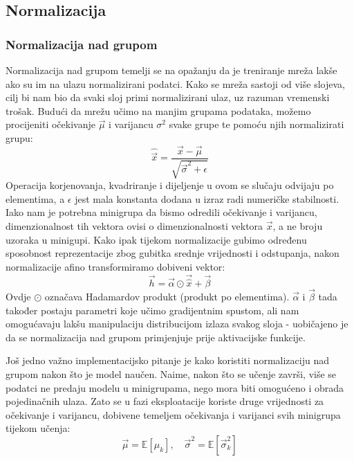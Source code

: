 \subsection{Normalizacija}
\subsubsection{Normalizacija nad grupom}
Normalizacija nad grupom  \citep{ioffe2015batch} temelji se na opažanju da je treniranje mreža lakše ako su im na ulazu normalizirani podatci. Kako se mreža sastoji od više slojeva, cilj bi nam bio da svaki sloj primi normalizirani ulaz, uz razuman vremenski trošak. Budući da mrežu učimo na manjim grupama podataka, možemo procijeniti očekivanje $\vec{\mu}$ i varijancu $\sigma^2$ svake grupe te pomoću njih normalizirati grupu:
\begin{equation}
\hat{\vec{x}} = \frac{\vec{x} - \vec{\mu}}{\sqrt{\vec{\sigma}^2 + \epsilon}}
\end{equation}
Operacija korjenovanja, kvadriranje i dijeljenje u ovom se slučaju odvijaju po elementima, a $\epsilon$ jest mala konstanta dodana u izraz radi numeričke stabilnosti. Iako nam je potrebna minigrupa da bismo odredili očekivanje i varijancu, dimenzionalnost tih vektora ovisi o dimenzionalnosti vektora $\vec{x}$, a ne broju uzoraka u minigupi. Kako ipak tijekom normalizacije gubimo određenu sposobnost reprezentacije zbog gubitka srednje vrijednosti i odstupanja, nakon normalizacije afino transformiramo dobiveni vektor:
\begin{equation}
\label{affine}
\vec{h} = \vec{\alpha} \odot \vec{\hat{x}} + \vec{\beta}
\end{equation}
Ovdje $\odot$ označava Hadamardov produkt (produkt po elementima). $\vec{\alpha}$ i $\vec{\beta}$ tada također postaju parametri koje učimo gradijentnim spustom, ali nam omogućavaju lakšu manipulaciju distribucijom izlaza svakog sloja - uobičajeno je da se normalizacija nad grupom primjenjuje prije aktivacijske funkcije. 

Još jedno važno implementacijsko pitanje je kako koristiti normalizaciju nad grupom nakon što je model naučen. Naime, nakon što se učenje završi, više se podatci ne predaju modelu u minigrupama, nego mora biti omogućeno i obrada pojedinačnih ulaza. Zato se u fazi eksploatacije koriste druge vrijednosti za očekivanje i varijancu, dobivene temeljem očekivanja i varijanci svih minigrupa tijekom učenja:
\begin{equation}
\vec{\mu} = \mathbb{E}\left[\mu_k\right], \quad \vec{\sigma}^2 = \mathbb{E}\left[\vec{\sigma}^2_k\right]
\end{equation}

